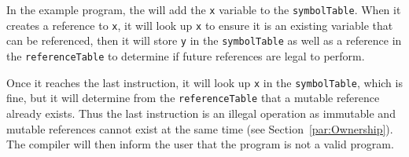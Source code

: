 In the example program, the \borrowChecker{} will add the \texttt{x} variable to the
\texttt{symbolTable}. When it creates a reference to \texttt{x}, it will look up
\texttt{x} to ensure it is an existing variable that can be referenced, then it will
store \texttt{y} in the \texttt{symbolTable} as well as a reference in the
\texttt{referenceTable} to determine if future references are legal to perform. 

Once it reaches the last instruction, it will look up \texttt{x} in the
\texttt{symbolTable}, which is fine, but it will determine from the
\texttt{referenceTable} that a mutable reference already exists. Thus the last
instruction is an illegal operation as immutable and mutable references cannot exist
at the same time (see Section~\ref{par:Ownership}). The compiler will then inform the
user that the program is not a valid \lang{} program.

